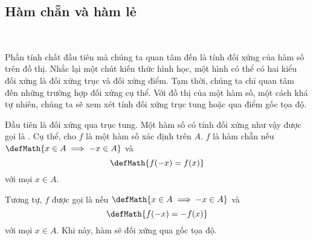 \subsection{Hàm chẵn và hàm lẻ}

\ %

Phần tính chất đầu tiên mà chúng ta quan tâm đến là tính đối xứng của hàm số trên đồ thị. Nhắc lại một chút kiến thức hình học, một hình có thể có hai kiểu đối xứng là đối xứng trục và đối xứng điểm. Tạm thời, chúng ta chỉ quan tâm đến những trường hợp đối xứng cụ thể. Với đồ thị của một hàm số, một cách khá tự nhiên, chúng ta sẽ xem xét tính đối xứng trục tung hoặc qua điểm gốc tọa độ. 

Đầu tiên là đối xứng qua trục tung. Một hàm số có tính đối xứng như vậy được gọi là . Cụ thể, cho $f$ là một hàm số xác định trên $A$. $f$ là hàm chẵn nếu $\defMath{x \in A \implies -x \in A}$ và $$\defMath{f(-x) = f(x)}$$ với mọi $x \in A$. 

Tương tự, $f$ được gọi là  nếu $\defMath{x \in A \implies -x \in A}$ và $$\defMath{f(-x) = -f(x)}$$ với mọi $x \in A$. Khi này, hàm sẽ đối xứng qua gốc tọa độ.

